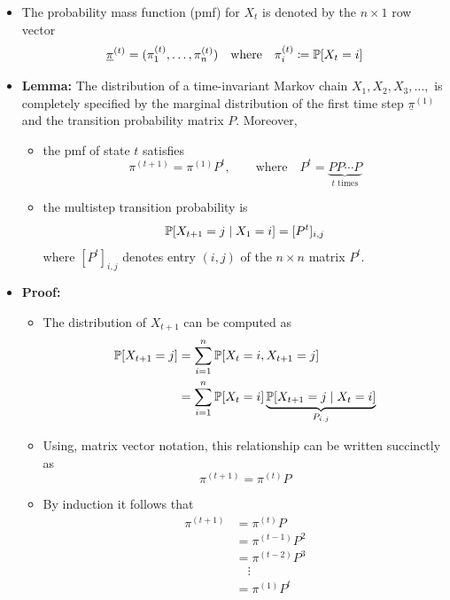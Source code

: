 \documentclass[11pt,twoside]{report}
\newcommand{\bbN}{{\mathbb{N}}}
\newcommand{\vecnot}{\underline}
\begin{document}
\begin{itemize}
\item The probability mass function (pmf) for  $X_t$  is denoted by the $n \times 1$ row vector 
\[
\vecnot{\pi}^{(t)} = (\pi_{1}^{(t)},\ldots,\pi_{n}^{(t)}) \quad \text{where} \quad \pi_{i}^{(t)}\coloneqq \pr{ X_{t}=i} 
\]

\item \textbf{Lemma:}  The distribution of a time-invariant Markov chain  $X_1, X_2, X_3, \dots, $ is completely specified by the marginal distribution  of the first time step $\vecnot{\pi}^{(1)}$ and  the transition probability matrix $P$.  
Moreover, 
\begin{itemize}
\item the pmf of state $t$ satisfies
\[
\pi^{(t+1)}  = \pi^{(1)} P^t , \qquad \text{where} \quad P^t = \underbrace{P P \cdots P}_\text{$t$ times}%
\]
\item the multistep transition probability is 
\[
\pr{ X_{t+1} = j \mid X_1 = i} =[ P^t]_{i,j}
\]
where $[P^t]_{i,j}$ denotes  entry $(i,j)$ of the $n \times  n$ matrix $P^t$.
\end{itemize}
\item \textbf{Proof:} 
\begin{itemize}
\item The  distribution of $X_{t+1}$ can be computed as 
\begin{align*}
 \pr{ X_{t+1} =j } 
& =\sum_{i=1}^{n}\pr{X_t = i,  X_{t+1}=j} \\
 & =\sum_{i=1}^{n} \pr{ X_{t}=i} \underbrace{ \pr{ X_{t+1}=j \mid X_{t}=i}}_{P_{i.j}}  %
\end{align*}
\item Using, matrix vector notation, this relationship can be written succinctly as 
\[
\pi^{(t+1)}   = \pi^{(t)}  P 
\]
\item By induction it follows that
\begin{align*}
\pi^{(t+1)}  &  = \pi^{(t)}  P \\
&  = \pi^{(t-1)}  P^2\\
&  = \pi^{(t-2)}  P^3\\
&\quad  \vdots\\
& = \pi^{(1)} P^t  
\end{align*}
\end{itemize}


\end{itemize}
\end{document}
